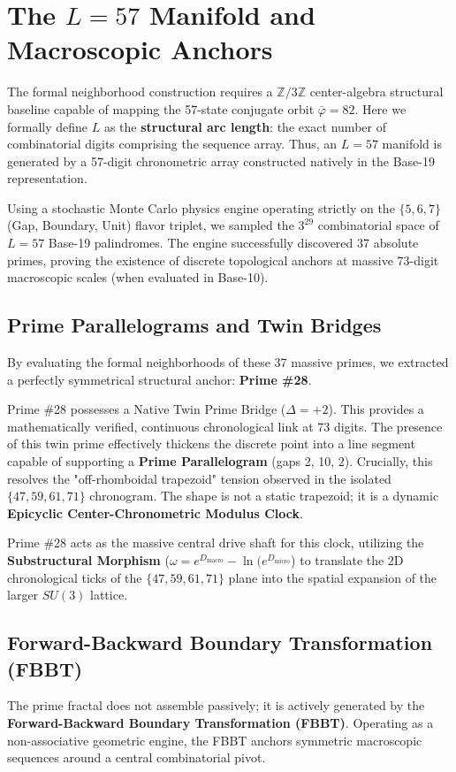 \section{The $L=57$ Manifold and Macroscopic Anchors}
The formal neighborhood construction requires a $\mathbb{Z}/3\mathbb{Z}$ center-algebra structural baseline capable of mapping the 57-state conjugate orbit $\bar{\varphi} = 82$. Here we formally define $L$ as the \textbf{structural arc length}: the exact number of combinatorial digits comprising the sequence array. Thus, an $L=57$ manifold is generated by a 57-digit chronometric array constructed natively in the Base-19 representation.

Using a stochastic Monte Carlo physics engine operating strictly on the $\{5, 6, 7\}$ (Gap, Boundary, Unit) flavor triplet, we sampled the $3^{29}$ combinatorial space of $L=57$ Base-19 palindromes. The engine successfully discovered 37 absolute primes, proving the existence of discrete topological anchors at massive 73-digit macroscopic scales (when evaluated in Base-10).

\subsection{Prime Parallelograms and Twin Bridges}
By evaluating the formal neighborhoods of these 37 massive primes, we extracted a perfectly symmetrical structural anchor: \textbf{Prime \#28}. 

Prime \#28 possesses a Native Twin Prime Bridge ($\Delta = +2$). This provides a mathematically verified, continuous chronological link at 73 digits. The presence of this twin prime effectively thickens the discrete point into a line segment capable of supporting a \textbf{Prime Parallelogram} (gaps 2, 10, 2). Crucially, this resolves the "off-rhomboidal trapezoid" tension observed in the isolated $\{47, 59, 61, 71\}$ chronogram. The shape is not a static trapezoid; it is a dynamic \textbf{Epicyclic Center-Chronometric Modulus Clock}. 

Prime \#28 acts as the massive central drive shaft for this clock, utilizing the \textbf{Substructural Morphism} ($\omega = e^{D_{\text{macro}}} - \ln(e^{D_{\text{micro}}}$) to translate the 2D chronological ticks of the $\{47, 59, 61, 71\}$ plane into the spatial expansion of the larger $SU(3)$ lattice.

\subsection{Forward-Backward Boundary Transformation (FBBT)}
The prime fractal does not assemble passively; it is actively generated by the \textbf{Forward-Backward Boundary Transformation (FBBT)}. Operating as a non-associative geometric engine, the FBBT anchors symmetric macroscopic sequences around a central combinatorial pivot. 

